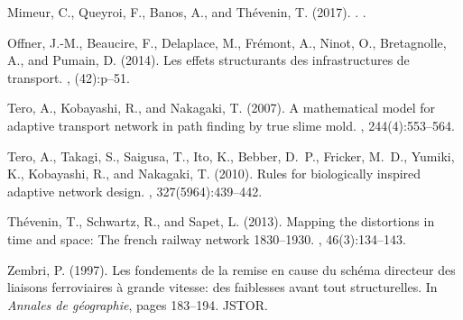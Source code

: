 \begin{thebibliography}{}
Mimeur, C., Queyroi, F., Banos, A., and Th{\'e}venin, T. (2017).
.
.

Offner, J.-M., Beaucire, F., Delaplace, M., Fr{\'e}mont, A., Ninot, O.,
  Bretagnolle, A., and Pumain, D. (2014).
\newblock Les effets structurants des infrastructures de transport.
, (42):p--51.

Tero, A., Kobayashi, R., and Nakagaki, T. (2007).
\newblock A mathematical model for adaptive transport network in path finding
  by true slime mold.
, 244(4):553--564.

Tero, A., Takagi, S., Saigusa, T., Ito, K., Bebber, D.~P., Fricker, M.~D.,
  Yumiki, K., Kobayashi, R., and Nakagaki, T. (2010).
\newblock Rules for biologically inspired adaptive network design.
, 327(5964):439--442.

Th{\'e}venin, T., Schwartz, R., and Sapet, L. (2013).
\newblock Mapping the distortions in time and space: The french railway network
  1830--1930.
, 46(3):134--143.

Zembri, P. (1997).
\newblock Les fondements de la remise en cause du sch{\'e}ma directeur des
  liaisons ferroviaires {\`a} grande vitesse: des faiblesses avant tout
  structurelles.
\newblock In {\em Annales de g{\'e}ographie}, pages 183--194. JSTOR.

\end{thebibliography}






